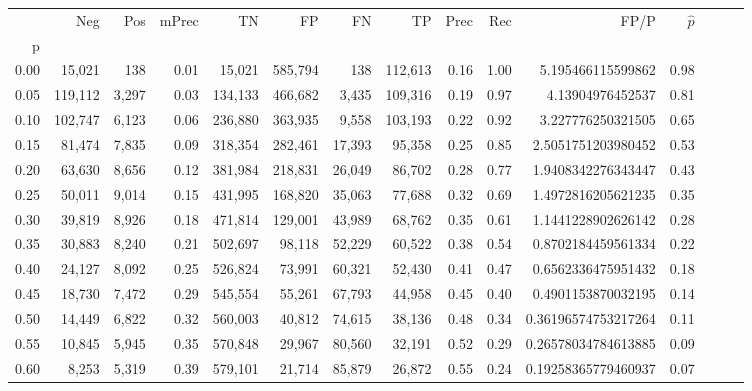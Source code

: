 \begin{tabular}{rrrrrrrrrrrrrrr}
\toprule
{} &      Neg &    Pos & mPrec &       TN &       FP &       FN &       TP &  Prec &   Rec &                  FP/P & $\hat{p}$ \\
p    &          &        &       &          &          &          &          &       &       &                       &           \\
\midrule
0.00 &   15,021 &    138 &  0.01 &   15,021 &  585,794 &      138 &  112,613 &  0.16 &  1.00 &     5.195466115599862 &      0.98 \\
0.05 &  119,112 &  3,297 &  0.03 &  134,133 &  466,682 &    3,435 &  109,316 &  0.19 &  0.97 &      4.13904976452537 &      0.81 \\
0.10 &  102,747 &  6,123 &  0.06 &  236,880 &  363,935 &    9,558 &  103,193 &  0.22 &  0.92 &     3.227776250321505 &      0.65 \\
0.15 &   81,474 &  7,835 &  0.09 &  318,354 &  282,461 &   17,393 &   95,358 &  0.25 &  0.85 &    2.5051751203980452 &      0.53 \\
0.20 &   63,630 &  8,656 &  0.12 &  381,984 &  218,831 &   26,049 &   86,702 &  0.28 &  0.77 &    1.9408342276343447 &      0.43 \\
0.25 &   50,011 &  9,014 &  0.15 &  431,995 &  168,820 &   35,063 &   77,688 &  0.32 &  0.69 &    1.4972816205621235 &      0.35 \\
0.30 &   39,819 &  8,926 &  0.18 &  471,814 &  129,001 &   43,989 &   68,762 &  0.35 &  0.61 &    1.1441228902626142 &      0.28 \\
0.35 &   30,883 &  8,240 &  0.21 &  502,697 &   98,118 &   52,229 &   60,522 &  0.38 &  0.54 &    0.8702184459561334 &      0.22 \\
0.40 &   24,127 &  8,092 &  0.25 &  526,824 &   73,991 &   60,321 &   52,430 &  0.41 &  0.47 &    0.6562336475951432 &      0.18 \\
0.45 &   18,730 &  7,472 &  0.29 &  545,554 &   55,261 &   67,793 &   44,958 &  0.45 &  0.40 &    0.4901153870032195 &      0.14 \\
0.50 &   14,449 &  6,822 &  0.32 &  560,003 &   40,812 &   74,615 &   38,136 &  0.48 &  0.34 &   0.36196574753217264 &      0.11 \\
0.55 &   10,845 &  5,945 &  0.35 &  570,848 &   29,967 &   80,560 &   32,191 &  0.52 &  0.29 &   0.26578034784613885 &      0.09 \\
0.60 &    8,253 &  5,319 &  0.39 &  579,101 &   21,714 &   85,879 &   26,872 &  0.55 &  0.24 &   0.19258365779460937 &      0.07 \\

\end{tabular}
